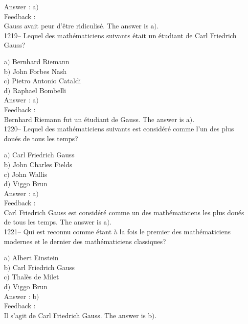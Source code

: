\documentclass[letterpaper, 12pt]{article}
\begin{document}
Answer : a$)$\\

Feedback :\\
Gauss avait peur d'\^etre ridiculis\'e.
The answer is a$)$.\\

1219-- Lequel des math\'ematiciens suivants \'etait un \'etudiant de
Carl Friedrich Gauss?

a$)$ Bernhard Riemann \\
b$)$ John Forbes Nash \\
c$)$ Pietro Antonio Cataldi \\
d$)$ Raphael Bombelli\\

Answer : a$)$\\

Feedback : \\
Bernhard Riemann fut un \'etudiant de Gauss.
The answer is a$)$.\\

1220-- Lequel des math\'ematiciens suivants est consid\'er\'e comme
l'un des plus dou\'es de tous les temps?

a$)$ Carl Friedrich Gauss \\
b$)$ John Charles Fields \\
c$)$ John Wallis \\
d$)$ Viggo Brun\\

Answer : a$)$\\

Feedback : \\
Carl Friedrich Gauss est consid\'er\'e comme un des math\'ematiciens
les plus dou\'es de tous les temps.
The answer is a$)$.\\

1221-- Qui est reconnu comme \'etant \`a la fois le premier des
math\'ematiciens modernes et le dernier des math\'ematiciens
classiques?

a$)$ Albert Einstein \\
b$)$ Carl Friedrich Gauss \\
c$)$ Thal\`es de Milet \\
d$)$ Viggo Brun\\

Answer : b$)$\\

Feedback : \\
Il s'agit de Carl Friedrich Gauss.
The answer is b$)$.\\
\end{document}
